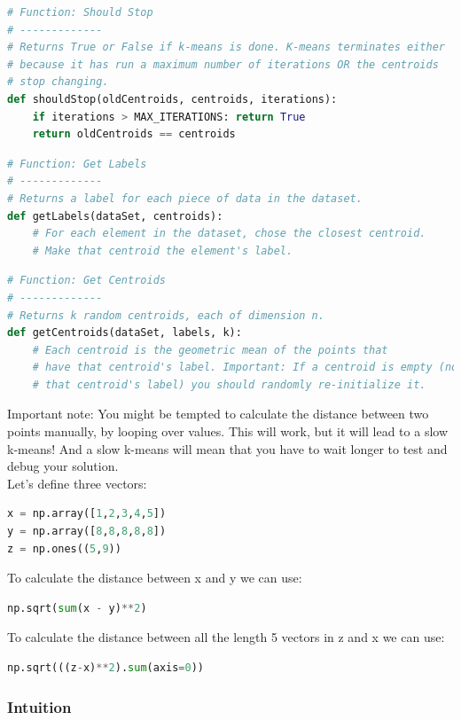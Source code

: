 \documentclass[10pt,letterpaper]{article}
\begin{document}
\begin{lstlisting}[language=Python, caption=Should Stop Function Pseudo]
# Function: Should Stop
# -------------
# Returns True or False if k-means is done. K-means terminates either
# because it has run a maximum number of iterations OR the centroids
# stop changing.
def shouldStop(oldCentroids, centroids, iterations):
	if iterations > MAX_ITERATIONS: return True
	return oldCentroids == centroids
\end{lstlisting}

\begin{lstlisting}[language=Python, caption=Get Labels Function]
# Function: Get Labels
# -------------
# Returns a label for each piece of data in the dataset. 
def getLabels(dataSet, centroids):
	# For each element in the dataset, chose the closest centroid. 
	# Make that centroid the element's label.
\end{lstlisting}

\begin{lstlisting}[language=Python, caption=Get Centroid Function]
# Function: Get Centroids
# -------------
# Returns k random centroids, each of dimension n.
def getCentroids(dataSet, labels, k):
	# Each centroid is the geometric mean of the points that
	# have that centroid's label. Important: If a centroid is empty (no points have
	# that centroid's label) you should randomly re-initialize it.
\end{lstlisting}
Important note: You might be tempted to calculate the distance between two points manually, by looping over values. This will work, but it will lead to a slow k-means! And a slow k-means will mean that you have to wait longer to test and debug your solution.\\

Let's define three vectors:
\begin{lstlisting}[language=Python]
x = np.array([1,2,3,4,5])
y = np.array([8,8,8,8,8])
z = np.ones((5,9))
\end{lstlisting}
To calculate the distance between x and y we can use:
\begin{lstlisting}[language=Python]
np.sqrt(sum(x - y)**2)
\end{lstlisting}
To calculate the distance between all the length 5 vectors in z and x we can use:
\begin{lstlisting}[language=Python]
np.sqrt(((z-x)**2).sum(axis=0))
\end{lstlisting}

\subsubsection{Intuition}
\end{document}
